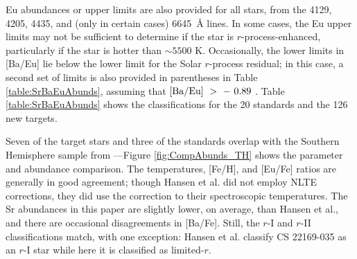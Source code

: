 \documentclass[preprint]{aastex61}
\begin{document}
Eu abundances or upper limits are also provided for all stars,
from the  4129, 4205, 4435, and (only in certain cases)
6645~\AA \hspace{0.025in} lines.  In some cases, the Eu upper limits
may not be sufficient to determine if the star is
$r$-process-enhanced, particularly if the star is hotter than 
$\sim 5500$ K. Occasionally, the lower limits in [Ba/Eu] lie below the
lower limit for the Solar $r$-process residual; in this case, a second
set of limits is also provided in parentheses in Table
\ref{table:SrBaEuAbunds}, assuming that $[\rm{Ba/Eu}]~>~-~0.89$
\citep{Burris2000}.  Table \ref{table:SrBaEuAbunds} shows the
classifications for the 20 standards and the 126 new targets.

Seven of the target stars and three of the standards overlap with the
Southern Hemisphere sample from \citet{Hansen2018}---Figure
\ref{fig:CompAbunds_TH} shows the parameter and abundance comparison.
The temperatures, [Fe/H], and [Eu/Fe] ratios are generally in good
agreement; though Hansen et al. did not employ NLTE corrections, they
did use the \citet{Frebel2013} correction to their spectroscopic
temperatures.  The Sr abundances in this paper are slightly lower, on
average, than Hansen et al., and there are occasional disagreements in
[Ba/Fe]. Still, the $r$-I and $r$-II classifications match, with one
exception: Hansen et al. classify CS 22169-035 as an $r$-I star while
here it is classified as limited-$r$.
\end{document}
